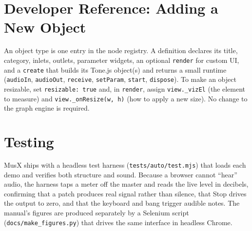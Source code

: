 \documentclass[11pt,letterpaper]{article}
\begin{document}
\section{Developer Reference: Adding a New Object}
\label{sec:dev}

An object type is one entry in the node registry. A definition declares its title,
category, inlets, outlets, parameter widgets, an optional \texttt{render} for custom UI,
and a \texttt{create} that builds its Tone.js object(s) and returns a small runtime
(\texttt{audioIn}, \texttt{audioOut}, \texttt{receive}, \texttt{setParam}, \texttt{start},
\texttt{dispose}). To make an object resizable, set \texttt{resizable: true} and, in
\texttt{render}, assign \texttt{view.\_vizEl} (the element to measure) and
\texttt{view.\_onResize(w, h)} (how to apply a new size). No change to the graph engine is
required.

\section{Testing}

MusX ships with a headless test harness (\texttt{tests/auto/test.mjs}) that loads each demo
and verifies both structure and sound. Because a browser cannot ``hear'' audio, the harness
taps a meter off the master and reads the live level in decibels, confirming that a patch
produces real signal rather than silence, that Stop drives the output to zero, and that the
keyboard and bang trigger audible notes. The manual's figures are produced separately by a
Selenium script (\texttt{docs/make\_figures.py}) that drives the same interface in headless
Chrome.
\end{document}
